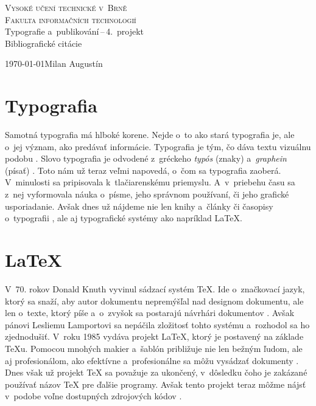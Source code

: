 \documentclass[a4paper, 11pt]{article}
\begin{document}
\begin{titlepage}
\begin{center}
\textsc{{\Huge Vysoké učení technické v~Brně}\\{\huge Fakulta informačních technologií\\}}
{\LARGE Typografie a~publikování\,--\,4.~projekt\\[2mm]
\Huge Bibliografické citácie}
\end{center}
{\Large \today \hfill Milan Augustín}
\end{titlepage}

\newpage

\section{Typografia}

Samotná typografia má hlboké korene. Nejde o~to ako stará typografia je, ale o~jej význam, ako predávať informácie. Typografia je tým, čo dáva textu vizuálnu podobu \cite{Ambrose:Typografie}. Slovo typografia je odvodené z~gréckeho \emph{typós} (znaky) a~\emph{graphein} (písať) \cite{Olsak:Typografie}. Toto nám už teraz veľmi napovedá, o~čom sa typografia zaoberá. V~minulosti sa pripisovala k~tlačiarenskému priemyslu. A~v~priebehu času sa z~nej vyformovala náuka o~písme, jeho správnom používaní, či jeho grafické usporiadanie. Avšak dnes už nájdeme nie len knihy a~články či časopisy o~typografii \cite{Typo:Mag}, ale aj typografické systémy ako napríklad {\LaTeX}.

\section{{\LaTeX}}

V~70. rokov Donald Knuth vyvinul sádzací systém {\TeX}. Ide o~značkovací jazyk, ktorý sa snaží, aby autor dokumentu nepremýšľal nad designom dokumentu, ale len o~texte, ktorý píše a~o~zvyšok sa postarajú návrhári dokumentov \cite{Mittelbach:Introduction}. Avšak pánovi Lesliemu Lamportovi sa nepáčila zložitosť tohto systému a~rozhodol sa ho zjednodušiť. V~roku 1985 vydáva projekt {\LaTeX}, ktorý je postavený na základe {\TeX}u. Pomocou mnohých makier a~šablón približuje nie len bežným ľudom, ale aj profesionálom, ako efektívne a~profesionálne sa môžu vysádzať dokumenty \cite{Martinek:Latex}. Dnes však už projekt {\TeX} sa považuje za ukončený, v~dôsledku čoho je zakázané používať názov {\TeX} pre ďalšie programy. Avšak tento projekt teraz môžme nájsť v~podobe voľne dostupných zdrojových kódov \cite{Syropoulos:Zbornik}.
\end{document}
